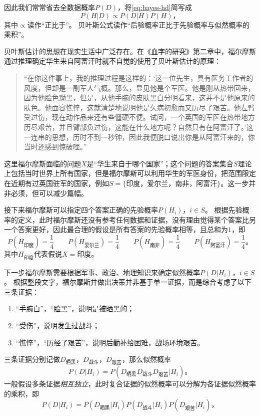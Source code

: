 因此我们常常省去全数据概率$P(D)$，将\cref{eq:bayes-hd}简写成
\begin{equation}\label{eq:bayes-propto}
    P(H|D)\propto P(D|H)P(H)，
\end{equation}
其中$\propto$读作“正比于”。
贝叶斯公式读作“后验概率正比于先验概率与似然概率的乘积”。

贝叶斯估计的思想在现实生活中广泛存在。在《血字的研究》第二章中，福尔摩斯通过推理确定华生来自阿富汗时就不自觉的使用了贝叶斯估计的原理：
\begin{quotation}
    “在你这件事上，我的推理过程是这样的：‘这一位先生，具有医务工作者的风度，但却是一副军人气概。那么，显见他是个军医。他是刚从热带回来，因为他脸色黝黑，但是，从他手腕的皮肤黑白分明看来，这并不是他原来的肤色。他面容憔悴，这就清楚地说明他是久病初愈而又历尽了艰苦。他左臂受过伤，现在动作品来还有些僵硬不便。试问，一个英国的军医在热带地方历尽艰苦，并且臂部负过伤，这能在什么地方呢？自然只有在阿富汗了。’这一连串的思想，历时不到一秒钟，因此我便脱口说出你是从阿富汗来的，你当时还感到惊破哩。”
\end{quotation}

这里福尔摩斯面临的问题$X$是“华生来自于哪个国家”；这个问题的答案集合$S$理论上包括当时世界上所有国家，但是福尔摩斯可以利用华生的军医身份，把范围限定在近期有过英国驻军的国家，例如$S=\{印度，爱尔兰，南非，阿富汗\}$。这一步并非必须，但可以减少篇幅。

接下来福尔摩斯可以指定四个答案正确的先验概率$P(H_i)，i\in S$。
根据先验概率的定义，此时福尔摩斯还没有参考任何数据和证据，没有理由觉得某个答案比另一个答案更好，因此最合理的假设是所有答案的先验概率相等，且总和为$1$，即
\begin{equation*}
    P(H_{印度})=\frac{1}{4}\qquad P(H_{爱尔兰})=\frac{1}{4}\qquad P(H_{南非})=\frac{1}{4}\qquad P(H_{阿富汗})=\frac{1}{4}。
\end{equation*}
其中$H_{印度}$代表假说$X=印度$。

下一步福尔摩斯需要根据军事、政治、地理知识来确定似然概率$P(D|H_i)，i\in S$。
根据整段文字，福尔摩斯并做出决策并非基于单一证据，而是综合考虑了以下三条证据：
\begin{enumerate}
    \item “手腕白”，“脸黑”，说明是被晒黑的；
    \item “受伤”，说明发生过战斗；
    \item “憔悴”，“历经了艰苦”，说明后勤补给困难，战场环境艰苦。
\end{enumerate}

三条证据分别记做$D_{晒黑}$，$D_{战斗}$，$D_{艰苦}$，那么似然概率
\begin{equation*}
    P(D|H_i)=P(D_{晒黑}D_{战斗}D_{艰苦}|H_i)。
\end{equation*}
一般假设多条证据\emph{相互独立}，此时复合证据的似然概率可以分解为各证据似然概率的乘积，即
\begin{equation}
    P(D|H_i)=P(D_{晒黑}|H_i)P(D_{战斗}|H_i)P(D_{艰苦}|H_i)，
\end{equation}

